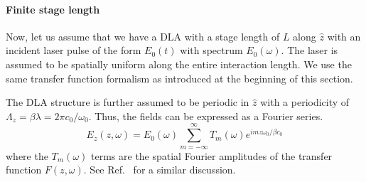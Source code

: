 \paragraph{Finite stage length}


Now, let us assume that we have a DLA with a stage length of $L$ along $\hat{z}$ with an incident laser pulse of the form $E_0(t)$ with spectrum $E_0(\omega)$. The laser is assumed to be spatially uniform along the entire interaction length. We use the same transfer function formalism as introduced at the beginning of this section.

The DLA structure is further assumed to be periodic in $\hat{z}$ with a periodicity of $\Lambda_z = \beta \lambda = 2\pi c_0/\omega_0$. Thus, the fields can be expressed as a Fourier series.
\begin{equation}
    E_z(z,\omega) = E_0(\omega) \sum_{m=-\infty}^{\infty} T_m(\omega) e^{i m z \omega_0 / \beta c_0}
\end{equation}
where the $T_m(\omega)$ terms are the spatial Fourier amplitudes of the transfer function $F(z,\omega)$. See Ref.~\cite{plettner2009photonic} for a similar discussion.

